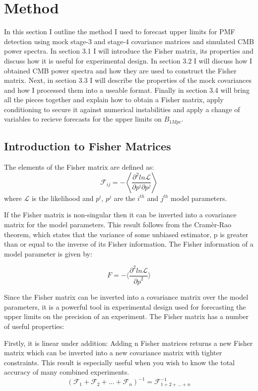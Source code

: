\section{Method}

In this section I outline the method I used to forecast upper limits for PMF detection using mock stage-3 and stage-4 covariance matrices and simulated CMB power spectra. In section 3.1 I will introduce the Fisher matrix, its properties and discuss how it is useful for experimental design. In section 3.2 I will discuss how I obtained CMB power spectra and how they are used to construct the Fisher matrix. Next, in section 3.3 I will describe the properties of the mock covariances and how I processed them into a useable format. Finally in section 3.4 will bring all the pieces together and explain how to obtain a Fisher matrix, apply conditioning to secure it against numerical instabilities and apply a change of variables to recieve forecasts for the upper limits on $B_{1Mpc}$.

\subsection{Introduction to Fisher Matrices}
The elements of the Fisher matrix are defined as:
\begin{equation}
\mathcal{F}_{ij} = - \left \langle \frac{\partial^{2}ln{\mathcal{L}}}{\partial p^i\partial p^j } \right \rangle
\end{equation}
where $\mathcal{L}$ is the likelihood and $p^{i}$, $p^{j}$ are the $i^{th}$ and $j^{th}$ model parameters.
  
If the Fisher matrix is non-singular then it can be inverted into a covariance matrix for the model parameters. This result follows from the Cram\`{e}r-Rao theorem, which states that the variance of some unbiased estimator, p is greater than or equal to the inverse of its Fisher information. The Fisher information of a model parameter is given by:

\begin{equation}
F = - \langle \frac{\partial^{2}ln{\mathcal{L}}}{{\partial p}^2} \rangle
\end{equation}

Since the Fisher matrix can be inverted into a covariance matrix over the model parameters, it is a powerful tool in experimental design used for forecasting the upper limits on the precision of an experiment. The Fisher matrix has a number of useful properties:

Firstly, it is linear under addition: Adding n Fisher matrices returns a new Fisher matrix which can be inverted into a new covariance matrix with tighter constraints. This result is especially useful when you wish to know the total accuracy of many combined experiments.
\begin{equation}
(\mathcal{F}_{1} + \mathcal{F}_{2} + ... + \mathcal{F}_{n})^{-1} = \mathcal{F}^{-1}_{1+2+...+n}
\end{equation}

